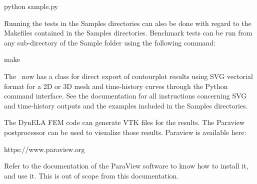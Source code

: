 \begin{BashListing}[numbers=none]
python sample.py
\end{BashListing}

Running the tests in the Samples directories can also be done with regard to the Makefiles contained in the Samples directories. Benchmark tests can be run from any sub-directory of the Sample folder using the following command:

\begin{BashListing}[numbers=none]
make
\end{BashListing}

The \DynELA~now has a class for direct export of contourplot results using SVG vectorial format for a 2D or 3D mesh and time-history curves through the Python command interface. See the documentation for all instructions concerning SVG and time-history outputs and the examples included in the Samples directories.

The DynELA FEM code can generate VTK files for the results. The Paraview postprocessor can be used to visualize those results. Paraview is available here:

\hspace*{1cm}\textsf{\hspace*{1cm}\textsf{https://www.paraview.org}}

Refer to the documentation of the ParaView software to know how to install it, and use it. This is out of scope from this documentation.
